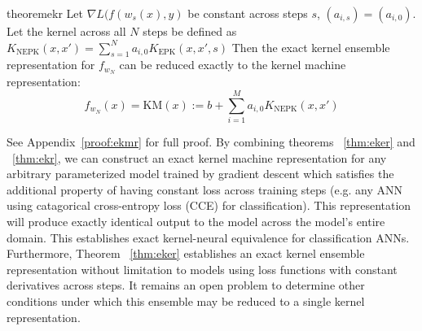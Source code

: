 \begin{restatable}{theorem}{ekr}
\label{thm:ekr}
Let $\nabla L(f(w_{s}(x), y)$ be constant  across steps $s$, $(a_{i,s}) = (a_{i,0})$. Let the kernel across all $N$ steps be defined as $K_{\text{NEPK}}(x,x') = \sum_{s = 1}^N a_{i,0} K_{\text{EPK}}(x, x', s)$ Then the exact kernel ensemble representation for $f_{w_N}$ can be reduced exactly to the kernel machine representation:
\begin{equation}
f_{w_N}(x) = \text{KM}(x) := b + \sum_{i = 1}^{M} a_{i,0} K_{\text{NEPK}}(x,x')
\label{exact}
\end{equation}
\end{restatable}
See Appendix~\ref{proof:ekmr} for full proof. By combining theorems ~\ref{thm:eker} and ~\ref{thm:ekr}, we can construct an exact kernel machine representation for any arbitrary parameterized model trained by gradient descent which satisfies the additional property of having constant loss across training steps (e.g. any ANN using catagorical cross-entropy loss (CCE) for classification). This representation will produce exactly identical output to the model across  the model's entire domain. This establishes exact kernel-neural equivalence for classification ANNs. Furthermore, Theorem ~\ref{thm:eker} establishes an exact kernel ensemble representation without limitation to models using loss functions with constant derivatives across steps. It remains an open problem to determine other conditions under which this ensemble may be reduced to a single kernel representation.  



